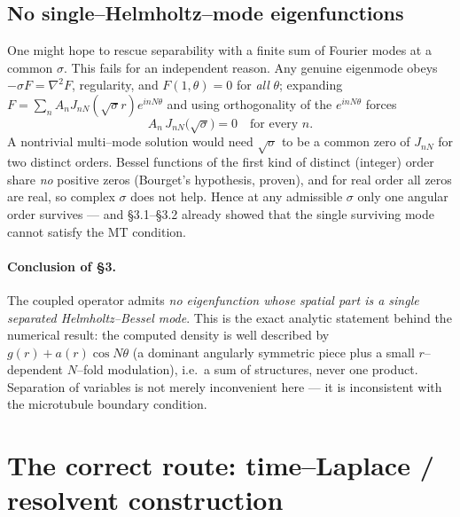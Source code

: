 \documentclass{article}
\begin{document}
\subsection{No single--Helmholtz--mode eigenfunctions}
One might hope to rescue separability with a finite sum of Fourier modes at a
common $\sigma$. This fails for an independent reason. Any genuine eigenmode
obeys $-\sigma F=\nabla^2F$, regularity, and $F(1,\theta)=0$ for \emph{all}
$\theta$; expanding $F=\sum_n A_n J_{nN}(\sqrt\sigma r)e^{inN\theta}$ and using
orthogonality of the $e^{inN\theta}$ forces
\begin{equation}
A_n\,J_{nN}\!\bigl(\sqrt\sigma\bigr)=0\quad\text{for every }n .
\end{equation}
A nontrivial multi--mode solution would need $\sqrt\sigma$ to be a common zero
of $J_{nN}$ for two distinct orders. Bessel functions of the first kind of
distinct (integer) order share \emph{no} positive zeros (Bourget's hypothesis,
proven), and for real order all zeros are real, so complex $\sigma$ does not
help. Hence at any admissible $\sigma$ only one angular order survives --- and
\S3.1--\S3.2 already showed that the single surviving mode cannot satisfy the MT
condition.

\paragraph{Conclusion of \S3.} The coupled operator admits \emph{no
eigenfunction whose spatial part is a single separated Helmholtz--Bessel mode}.
This is the exact analytic statement behind the numerical result: the computed
density is well described by $g(r)+a(r)\cos N\theta$ (a dominant angularly
symmetric piece plus a small $r$--dependent $N$--fold modulation), i.e.\ a sum
of structures, never one product. Separation of variables is not merely
inconvenient here --- it is inconsistent with the microtubule boundary
condition.

\section{The correct route: time--Laplace / resolvent construction}
\end{document}
